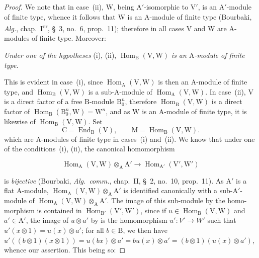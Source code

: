 \begin{proof}
We note that in case~(ii), $\mathrm{W}$, being $\mathrm{A}'$-isomorphic to $\mathrm{V}'$, is an $\mathrm{A}'$-module of finite type, whence it follows that $\mathrm{W}$ is
an $\mathrm{A}$-module of finite type (Bourbaki, \emph{Alg.}, chap.~I\textsuperscript{er}, \S~3, no.~6, prop.~11); therefore in all cases $\mathrm{V}$ and $\mathrm{W}$ are
$\mathrm{A}$-modules of finite type. Moreover:

\begin{env}[2.5.8.1]
\label{IV.2.5.8.1}
\emph{Under one of the hypotheses} (i), (ii), $\operatorname{Hom}_{\mathrm{B}}(\mathrm{V},\mathrm{W})$ \emph{is an $\mathrm{A}$-module of finite type.}
\end{env}

This is evident in case~(i), since $\operatorname{Hom}_{\mathrm{A}}(\mathrm{V},\mathrm{W})$ is then an $\mathrm{A}$-module of finite type, and $\operatorname{Hom}_{\mathrm{B}}(\mathrm{V},\mathrm{W})$ is a
sub-$\mathrm{A}$-module of $\operatorname{Hom}_{\mathrm{A}}(\mathrm{V},\mathrm{W})$. In case~(ii), $\mathrm{V}$ is a direct factor of a free $\mathrm{B}$-module $\mathrm{B}_0^n$, therefore $\operatorname{Hom}_{\mathrm{B}}(\mathrm{V},\mathrm{W})$ is a
direct factor of $\operatorname{Hom}_{\mathrm{B}}(\mathrm{B}_0^n,\mathrm{W})=\mathrm{W}^n$, and as $\mathrm{W}$ is an $\mathrm{A}$-module of finite type, it is likewise of $\operatorname{Hom}_{\mathrm{B}}(\mathrm{V},\mathrm{W})$.
Set
\[
  \mathrm{C}=\operatorname{End}_{\mathrm{B}}(\mathrm{V}),\qquad \mathrm{M}=\operatorname{Hom}_{\mathrm{B}}(\mathrm{V},\mathrm{W}).
\]
which are $\mathrm{A}$-modules of finite type in cases~(i) and~(ii). We know that under one of the conditions~(i), (ii), the canonical
homomorphism

\begin{env}[2.5.8.2]
\label{IV.2.5.8.2}
\[
  \operatorname{Hom}_{\mathrm{A}}(\mathrm{V},\mathrm{W})\otimes_{\mathrm{A}}\mathrm{A}' \to \operatorname{Hom}_{\mathrm{A}'}(\mathrm{V}',\mathrm{W}')
\]
\end{env}

is \emph{bijective} (Bourbaki, \emph{Alg.\ comm.}, chap.~II, \S~2, no.~10, prop.~11). As $\mathrm{A}'$ is a flat $\mathrm{A}$-module, $\operatorname{Hom}_{\mathrm{A}}(\mathrm{V},\mathrm{W})\otimes_{\mathrm{A}}\mathrm{A}'$
is identified canonically with a sub-$\mathrm{A}'$-module of $\operatorname{Hom}_{\mathrm{A}}(\mathrm{V},\mathrm{W})\otimes_{\mathrm{A}}\mathrm{A}'$. The image of this sub-module by the homo-
morphism  is contained in $\operatorname{Hom}_{\mathrm{B}'}(\mathrm{V}',\mathrm{W}')$, since if $u\in\operatorname{Hom}_{\mathrm{B}}(\mathrm{V},\mathrm{W})$ and $a'\in\mathrm{A}'$, the image of $u\otimes a'$
by  is the homomorphism $u':V'\to W'$ such that $u'(x\otimes 1)=u(x)\otimes a'$; for all $b\in\mathrm{B}$, we then have
$u'((b\otimes 1)(x\otimes 1))=u(bx)\otimes a'=bu(x)\otimes a'=(b\otimes 1)(u(x)\otimes a')$, whence our assertion. This being so:


\end{proof}
